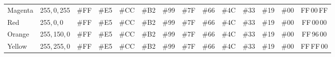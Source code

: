 \begin{infobox}
\begin{centering}
\begin{tabular}{llcccccccccccc}
{\footnotesize Magenta} & \multicolumn{1}{l}{{\footnotesize 255,\,0,\,255}} & {\footnotesize \cellcolor{ijmagenta}\#FF} & {\footnotesize \cellcolor{ijmagenta!90!shadecolor}\#E5} & {\footnotesize \cellcolor{ijmagenta!80!shadecolor}\#CC} & {\footnotesize \cellcolor{ijmagenta!70!shadecolor}\#B2} & {\footnotesize \cellcolor{ijmagenta!60!shadecolor}\#99} & {\footnotesize \cellcolor{ijmagenta!50!shadecolor}\#7F} & {\footnotesize \cellcolor{ijmagenta!40!shadecolor}\#66} & {\footnotesize \cellcolor{ijmagenta!30!shadecolor}\#4C} & {\footnotesize \cellcolor{ijmagenta!20!shadecolor}\#33} & {\footnotesize \cellcolor{ijmagenta!10!shadecolor}\#19} & {\footnotesize \#00} & {\footnotesize \cellcolor{ijmagenta!100!shadecolor}FF\,00\,FF}\tabularnewline
{\footnotesize Red} & \multicolumn{1}{l}{{\footnotesize 255,\,0,\,0}} & {\footnotesize \cellcolor{red}\#FF} & {\footnotesize \cellcolor{red!90!shadecolor}\#E5} & {\footnotesize \cellcolor{red!80!shadecolor}\#CC} & {\footnotesize \cellcolor{red!70!shadecolor}\#B2} & {\footnotesize \cellcolor{red!60!shadecolor}\#99} & {\footnotesize \cellcolor{red!50!shadecolor}\#7F} & {\footnotesize \cellcolor{red!40!shadecolor}\#66} & {\footnotesize \cellcolor{red!30!shadecolor}\#4C} & {\footnotesize \cellcolor{red!20!shadecolor}\#33} & {\footnotesize \cellcolor{red!10!shadecolor}\#19} & {\footnotesize \#00} & {\footnotesize \cellcolor{red!100!shadecolor}FF\,00\,00}\tabularnewline
{\footnotesize Orange} & \multicolumn{1}{l}{{\footnotesize 255,\,150,\,0}} & {\footnotesize \cellcolor{ijorange}\#FF} & {\footnotesize \cellcolor{ijorange!90!shadecolor}\#E5} & {\footnotesize \cellcolor{ijorange!80!shadecolor}\#CC} & {\footnotesize \cellcolor{ijorange!70!shadecolor}\#B2} & {\footnotesize \cellcolor{ijorange!60!shadecolor}\#99} & {\footnotesize \cellcolor{ijorange!50!shadecolor}\#7F} & {\footnotesize \cellcolor{ijorange!40!shadecolor}\#66} & {\footnotesize \cellcolor{ijorange!30!shadecolor}\#4C} & {\footnotesize \cellcolor{ijorange!20!shadecolor}\#33} & {\footnotesize \cellcolor{ijorange!10!shadecolor}\#19} & {\footnotesize \#00} & {\footnotesize \cellcolor{ijorange!100!shadecolor}FF\,96\,00}\tabularnewline
{\footnotesize Yellow} & \multicolumn{1}{l}{{\footnotesize 255,\,255,\,0}} & {\footnotesize \cellcolor{ijyellow}\#FF} & {\footnotesize \cellcolor{ijyellow!90!shadecolor}\#E5} & {\footnotesize \cellcolor{ijyellow!80!shadecolor}\#CC} & {\footnotesize \cellcolor{ijyellow!70!shadecolor}\#B2} & {\footnotesize \cellcolor{ijyellow!60!shadecolor}\#99} & {\footnotesize \cellcolor{ijyellow!50!shadecolor}\#7F} & {\footnotesize \cellcolor{ijyellow!40!shadecolor}\#66} & {\footnotesize \cellcolor{ijyellow!30!shadecolor}\#4C} & {\footnotesize \cellcolor{ijyellow!20!shadecolor}\#33} & {\footnotesize \cellcolor{ijyellow!10!shadecolor}\#19} & {\footnotesize \#00} & {\footnotesize \cellcolor{ijyellow!100!shadecolor}FF\,FF\,00}\tabularnewline

\end{tabular}
\end{centering}
\end{infobox}
